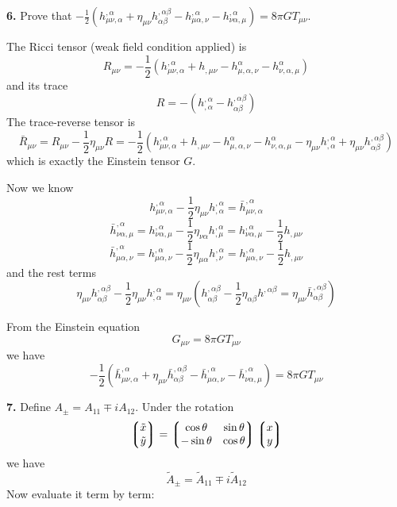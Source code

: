 \documentclass{article}
\renewcommand{\a}{\alpha}
\renewcommand{\b}{\beta}
\newcommand{\tx}{\tilde x}
\newcommand{\hb}{\bar h}
\begin{document}
{\bf6.}\quad
Prove that $-\frac{1}{2}(h^{,\a}_{\mu\nu,\a}+\eta_{\mu\nu}h^{,\a\b}_{\a\b}-h^{,\a}_{\mu\a,\nu}-h^{,\a}_{\nu\a,\mu})=8\pi GT_{\mu\nu}$.

The Ricci tensor (weak field condition applied) is
$$R_{\mu\nu}=-\frac{1}{2}(h^{,\a}_{\mu\nu,\a}+h_{,\mu\nu}-h^{\a}_{\mu,\a,\nu}-h^{\a}_{\nu,\a,\mu})$$
and its trace
$$R=-(h^{,\a}_{,\a}-h^{,\a\b}_{\a\b})$$
The trace-reverse tensor is
$$\bar R_{\mu\nu}=R_{\mu\nu}-\frac{1}{2}\eta_{\mu\nu}R=-\frac{1}{2}(h^{,\a}_{\mu\nu,\a}+h_{,\mu\nu}-h^{\a}_{\mu,\a,\nu}-h^{\a}_{\nu,\a,\mu}-\eta_{\mu\nu}h^{,\a}_{,\a}+\eta_{\mu\nu}h^{,\a\b}_{\a\b})$$
which is exactly the Einstein tensor $G$.

Now we know
$$h^{,\a}_{\mu\nu,\a}-\frac{1}{2}\eta_{\mu\nu}h^{,\a}_{,\a}=\hb^{,\a}_{\mu\nu,\a}$$
$$\hb^{,\a}_{\nu\a,\mu}=h^{,\a}_{\nu\a,\mu}-\frac{1}{2}\eta_{\nu\a}h^{,\a}_{,\mu}=h^{,\a}_{\nu\a,\mu}-\frac{1}{2}h_{,\mu\nu}$$
$$\hb^{,\a}_{\mu\a,\nu}=h^{,\a}_{\mu\a,\nu}-\frac{1}{2}\eta_{\mu\a}h^{,\a}_{,\nu}=h^{,\a}_{\mu\a,\nu}-\frac{1}{2}h_{,\mu\nu}$$
and the rest terms
$$\eta_{\mu\nu}h^{,\a\b}_{\a\b}-\frac{1}{2}\eta_{\mu\nu}h^{,\a}_{,\a}=\eta_{\mu\nu}(h^{,\a\b}_{\a\b}-\frac{1}{2}\eta_{\a\b}h^{,\a\b}=\eta_{\mu\nu}\hb^{,\a\b}_{\a\b})$$

From the Einstein equation
$$G_{\mu\nu}=8\pi GT_{\mu\nu}$$
we have
$$-\frac{1}{2}(\hb^{,\a}_{\mu\nu,\a}+\eta_{\mu\nu}\hb^{,\a\b}_{\a\b}-\hb^{,\a}_{\mu\a,\nu}-\hb^{,\a}_{\nu\a,\mu})=8\pi GT_{\mu\nu}$$

{\bf7.}\quad
Define $A_{\pm}=A_{11}\mp iA_{12}$. Under the rotation
$$\Pmqty{\tx\\\tilde y}=\Pmqty{\cos\theta&\sin\theta\\-\sin\theta&\cos\theta}\Pmqty{x\\y}$$
we have
$$\tilde A_{\pm}=\tilde A_{11}\mp i\tilde A_{12}$$
Now evaluate it term by term:
\end{document}
